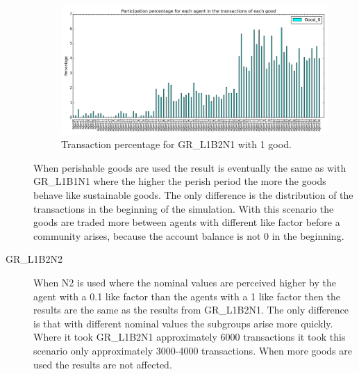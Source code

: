 \documentclass[twoside,openright]{uva-bachelor-thesis}
\begin{document}
\begin{description}
\begin{figure}[h!]
\centering
\includegraphics[scale=0.4]{Simulation2_figures/GR_L1B2N1_1good_5k} 
\caption{Transaction percentage for GR\_L1B2N1 with 1 good.}
\end{figure}


When perishable goods are used the result is eventually the same as with GR\_L1B1N1 where the higher the perish period the more the goods behave like sustainable goods. The only difference is the distribution of the transactions in the beginning of the simulation. With this scenario the goods are traded more between agents with different like factor before a community arises, because the account balance is not 0 in the beginning. 

\item[GR\_L1B2N2] When N2 is used where the nominal values are perceived higher by the agent with a 0.1 like factor than the agents with a 1 like factor then the results are the same as the results from GR\_L1B2N1. The only difference is that with different nominal values the subgroups arise more quickly. Where it took GR\_L1B2N1 approximately 6000 transactions it took this scenario only approximately 3000-4000 transactions. When more goods are used the results are not affected.


\end{description}
\end{document}
